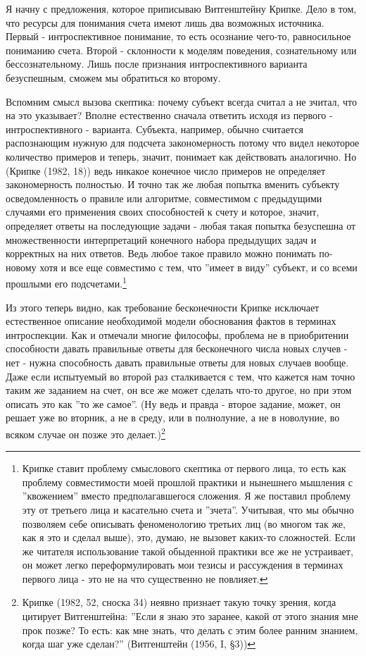 \documentclass[12pt]{book}
\begin{document}
Я начну с предложения, которое приписываю Витгенштейну Крипке. Дело в том, что ресурсы для понимания счета имеют лишь два возможных источника. Первый - интроспективное понимание, то есть осознание чего-то, равносильное пониманию счета. Второй - склонности к моделям поведения, сознательному или бессознательному. Лишь после признания интроспективного варианта безуспешным, сможем мы обратиться ко второму.

Вспомним смысл вызова скептика: почему субъект всегда считал а не зчитал, что на это указывает? Вполне естественно сначала ответить исходя из первого - интроспективного - варианта. Субъекта, например, обычно считается распознающим нужную для подсчета закономерность потому что видел некоторое количество примеров и теперь, значит, понимает как действовать аналогично. Но (Крипке (1982, 18)) ведь никакое конечное число примеров не определяет закономерность полностью. И точно так же любая попытка вменить субъекту осведомленность о правиле или алгоритме, совместимом с предыдущими случаями его применения своих способностей к счету и которое, значит, определяет ответы на последующие задачи - любая такая попытка безуспешна от множественности интерпретаций конечного набора предыдущих задач и корректных на них ответов. Ведь любое такое правило можно понимать по-новому хотя и все еще совместимо с тем, что ''имеет в виду'' субъект, и со всеми прошлыми его подсчетами.\footnote{Крипке ставит проблему смыслового скептика от первого лица, то есть как проблему совместимости моей прошлой практики и нынешнего мышления с ''квожением'' вместо предполагавшегося сложения. Я же поставил проблему эту от третьего лица и касательно счета и ''зчета''. Учитывая, что мы обычно позволяем себе описывать феноменологию третьих лиц (во многом так же, как я это и сделал выше), это, думаю, не вызовет каких-то сложностей. Если же читателя использование такой обыденной практики все же не устраивает, он может легко переформулировать мои тезисы и рассуждения в терминах первого лица - это не на что существенно не повлияет.}

Из этого теперь видно, как требование бесконечности Крипке исключает естественное описание необходимой модели обоснования фактов в терминах интроспекции. Как и отмечали многие философы, проблема не в приобритении способности давать правильные ответы для бесконечного числа новых случев - нет - нужна способность давать правильные ответы для новых случаев вообще. Даже если испытуемый во второй раз сталкивается с тем, что кажется нам точно таким же заданием на счет, он все же может сделать что-то другое, но при этом описать это как ''то же самое''. (Ну ведь и правда - второе задание, может, он решает уже во вторник, а не в среду, или в полнолуние, а не в новолуние, во всяком случае он позже это делает.)\footnote{Крипке (1982, 52, сноска 34) неявно признает такую точку зрения, когда цитирует Витгенштейна: ''Если я знаю это заранее, какой от этого знания мне прок позже? То есть: как мне знать, что делать с этим более ранним знанием, когда шаг уже сделан?'' (Витгенштейн (1956, I, §3))}
\end{document}
